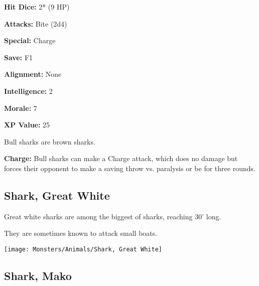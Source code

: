 \begin{multicols*}{2}
{\textbf{Hit Dice:} 2* (9 HP)

\textbf{Attacks:} Bite (2d4)

\textbf{Special:} Charge

\textbf{Save:} F1

\textbf{Alignment:} None

\textbf{Intelligence:} 2

\textbf{Morale:} 7

\textbf{XP Value:} 25}

Bull sharks are brown sharks.

\textbf{Charge:} Bull sharks can make a Charge attack, which does no damage but forces their opponent to make a saving throw vs. paralysis or be  for three rounds.

\subsection{Shark, Great White}

Great white sharks are among the biggest of sharks, reaching 30’ long.

They are sometimes known to attack small boats.

\texttt{[image: Monsters/Animals/Shark, Great White]}

\subsection{Shark, Mako}
\end{multicols*}

